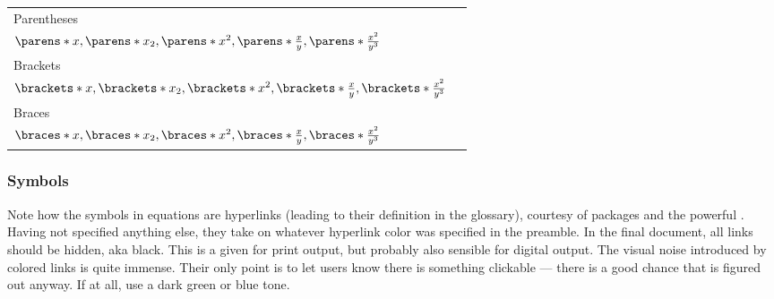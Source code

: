 \begin{table}[tbp]
{\begin{tabular}{%
            @{}
            l
            l
            @{}
        }
        \addlinespace
        Parentheses\footnotemark[1]       & \\
        \(
        \parens*{x},
        \parens*{x_{2}},
        \parens*{x^{2}},
        \parens*{\frac{x}{y}},
        \parens*{\frac{x^{2}}{y^{3}}}
        \)                                                                                                                                   \\
        Brackets\footnotemark[1]          & \\
        \(
        \brackets*{x},
        \brackets*{x_{2}},
        \brackets*{x^{2}},
        \brackets*{\frac{x}{y}},
        \brackets*{\frac{x^{2}}{y^{3}}}
        \)                                                                                                                                   \\
        Braces\footnotemark[1]            & \\
        \(
        \braces*{x},
        \braces*{x_{2}},
        \braces*{x^{2}},
        \braces*{\frac{x}{y}},
        \braces*{\frac{x^{2}}{y^{3}}}
        \)                                                                                                                                   \\
        \bottomrule
    \end{tabular}}
\end{table}

\subsubsection{Symbols}

Note how the symbols in equations are hyperlinks
(leading to their definition in the glossary), courtesy of
packages  and the powerful .
Having not specified anything else, they take on whatever hyperlink color was specified
in the preamble.
In the final document, all links should be hidden, aka black.
This is a given for print output, but probably also sensible for digital output.
The visual noise introduced by colored links is quite immense.
Their only point is to let users know there is something clickable ---
there is a good chance that is figured out anyway.
If at all, use a dark green or blue tone.

